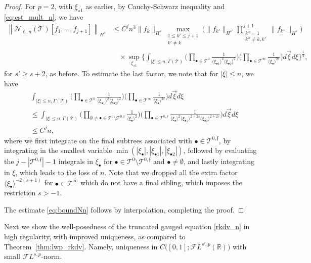\documentclass[a4paper,
11pt,  reqno]{amsart}
\newcommand{\jap}[1]{\langle #1 \rangle}
\newcommand{\5}{\textup{V}}
\newcommand{\FL}{\mathcal{F} L}
\theoremstyle{remark}
\newcommand{\R}{\mathbb{R}}
\newcommand{\bul}{\bullet}
\newcommand{\TT}{\mathcal{T}}
\newcommand{\G}{\Gamma}
\newcommand{\jb}[1]
{\langle #1 \rangle}
\newcommand{\ff}{\mathfrak{f}}
\numberwithin{equation}{section}
\numberwithin{theorem}{section}
\begin{document}
\begin{proof}
For $p=2$, with $\xi_{\star1}$ as earlier, by Cauchy-Schwarz inequality and \eqref{eq:est_mult_n}, we have
\begin{align*}
	\left\|\mathcal{N}_{\ell,n}(\TT)[f_1,\dots,f_{j+1}] \right\|_{H^s}
&
\le C^j n^3 \|f_k\|_{H^s}
\max_{\substack{1 \le k' \le j+1 \\ k' \ne k }} \bigg(\|f_{k'}\|_{H^{s'}} \prod_{\substack{k''=1 \\ k'' \ne k,k'}}^{j+1} \|f_{k''}\|_{H^s}\bigg)
\\
&
\quad
\times
 \sup_{\xi_{\star1}} \bigg\{  \int_{|\xi| \le n, \Gamma(\TT)}
\bigg(  \prod_{\bul \in \TT^0} \frac{1}{\jap{\xi_{\bul1}}^2 \jap{\xi_{\bul2}}^2 } \bigg)
\bigg( \prod_{\bul \in\TT^\infty}\frac{1}{\jap{\xi_\bul}^{2s}} \bigg)
d\vec{\xi} d\xi \bigg\}^\frac12,
\end{align*}
for $s'\ge s+2$, as before.
To estimate the last factor, we note that for $|\xi| \le n$, we have
\begin{align*}
&  \int_{|\xi|\le n, \Gamma(\TT)}
\bigg(  \prod_{\bul \in \TT^0} \frac{1}{\jap{\xi_{\bul1}}^2 \jap{\xi_{\bul2}}^2 } \bigg)
\bigg( \prod_{\bul \in\TT^\infty}\frac{1}{\jap{\xi_\bul}^{2s}} \bigg)
d\vec{\xi} d\xi
\\
&
\le \int_{|\xi| \le n, \G(\TT)} \bigg( \prod_{\emptyset \ne \bul\in \TT^0 \setminus \TT^{0,\ff}} \frac{1}{\jb{\xi_\bul}^{2}} \bigg) \bigg( \prod_{\bul\in \TT^{0,\ff}} \frac{1}{\jb{\xi_\bul}^2 \jb{\xi_{\bul1}}^{2+2s} \jb{\xi_{\bul2}}^{2+2s}  }\bigg)
d\vec\xi
d\xi
\\
&
\le C^j n,
\end{align*}
where we first integrate on the final subtrees associated with $\bul \in \TT^{0,\ff}$, by integrating in the smallest variable $\min(|\xi_\bul|, |\xi_{\bul1}|, |\xi_{\bul2}|)$, followed by evaluating the $j - |\TT^{0,\ff}| -1$ integrals in $\xi_\bul$ for $\bul \in \TT^{0} \setminus \TT^{0,\ff}$ and $\bul\ne \emptyset$, and lastly integrating in $\xi$, which leads to the loss of $n$. Note that we dropped all the extra factor  $\jb{\xi_\bul}^{-2(s+1)}$ for $\bul\in \TT^\infty$ which do not have a final sibling, which imposes the restriction $s>-1$.

The estimate \eqref{eq:boundNn} follows by interpolation, completing the proof. \qedhere



\end{proof}


Next we show the well-posedness of the truncated gauged equation \eqref{rkdv_n} in high regularity, with improved uniqueness, as compared to Theorem~\ref{thm:lwp_rkdv}. Namely, uniqueness in $C\big([0,1]; \FL^{s',p}(\R)\big)$ with small $\FL^{s,p}$-norm.
\end{document}
